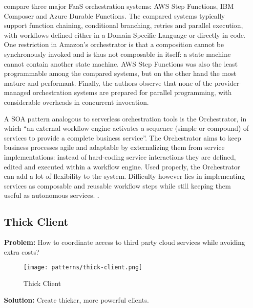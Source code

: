 \textcite{lopez18orchestration} compare three major FaaS orchestration systems: AWS Step Functions, IBM Composer and Azure Durable Functions. The compared systems typically support function chaining, conditional branching, retries and parallel execution, with workflows defined either in a Domain-Specific Language or directly in code. One restriction in Amazon's orchestrator is that a composition cannot be synchronously invoked and is thus not composable in itself: a state machine cannot contain another state machine. AWS Step Functions was also the least programmable among the compared systems, but on the other hand the most mature and performant. Finally, the authors observe that none of the provider-managed orchestration systems are prepared for parallel programming, with considerable overheads in concurrent invocation.

A SOA pattern analogous to serverless orchestration tools is the Orchestrator, in which ``an external workflow engine activates a sequence (simple or compound) of services to provide a complete business service''. The Orchestrator aims to keep business processes agile and adaptable by externalizing them from service implementations: instead of hard-coding service interactions they are defined, edited and executed within a workflow engine. Used properly, the Orchestrator can add a lot of flexibility to the system. Difficulty however lies in implementing services as composable and reusable workflow steps while still keeping them useful as autonomous services. \parencite{rotem12soa}.

\subsection{Thick Client} \label{subsec:thickClient}

\textbf{Problem:} How to coordinate access to third party cloud services while avoiding extra costs?

\begin{figure}[h]
  \centering
  \texttt{[image: patterns/thick-client.png]}
  \caption{Thick Client}
  \label{fig:patternThickClient}
\end{figure}

\textbf{Solution:} Create thicker, more powerful clients.

